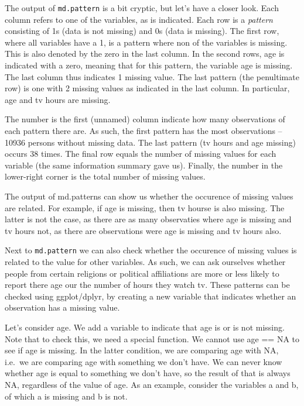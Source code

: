 \documentclass[]{tufte-book}
\begin{document}
The output of \texttt{md.pattern} is a bit cryptic, but let's have a closer look. Each column refers to one of the variables, as is indicated. Each row is a \emph{pattern} consisting of 1s (data is not missing) and 0s (data is missing). The first row, where all variables have a 1, is a pattern where non of the variables is missing. This is also denoted by the zero in the last column. In the second rows, age is indicated with a zero, meaning that for this pattern, the variable age is missing. The last column thus indicates 1 missing value. The last pattern (the penultimate row) is one with 2 missing values as indicated in the last column. In particular, age and tv hours are missing.

The number is the first (unnamed) column indicate how many observations of each pattern there are. As such, the first pattern has the most observations -- 10936 persons without missing data. The last pattern (tv hours and age missing) occurs 38 times. The final row equals the number of missing values for each variable (the same information summary gave us). Finally, the number in the lower-right corner is the total number of missing values.

The output of md.patterns can show us whether the occurence of missing values are related. For example, if age is missing, then tv hourse is also missing. The latter is not the case, as there are as many observaties where age is missing and tv hours not, as there are observations were age is missing and tv hours also.

Next to \texttt{md.pattern} we can also check whether the occurence of missing values is related to the value for other variables. As such, we can ask ourselves whether people from certain religions or political affiliations are more or less likely to report there age our the number of hours they watch tv. These patterns can be checked using ggplot/dplyr, by creating a new variable that indicates whether an observation has a missing value.

Let's consider age. We add a variable to indicate that age is or is not missing. Note that to check this, we need a special function. We cannot use age == NA to see if age is missing. In the latter condition, we are comparing age with NA, i.e.~we are comparing age with something we don't have. We can never know whether age is equal to something we don't have, so the result of that is always NA, regardless of the value of age. As an example, consider the variables a and b, of which a is missing and b is not.
\end{document}
